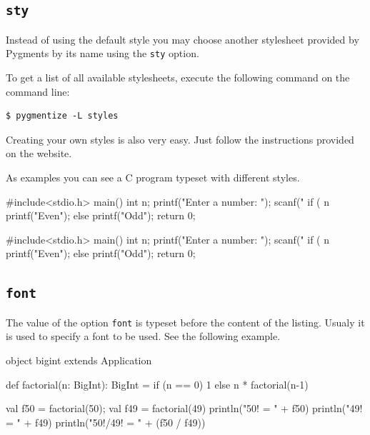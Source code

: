 \documentclass[10pt,a4paper]{article}
\begin{document}
\subsection{\texttt{sty}}

Instead of using the default style you may choose another stylesheet
provided by Pygments by its name using the \verb|sty| option.

To get a list of all available stylesheets, execute the following
command on the command line:
\begin{verbatim}
$ pygmentize -L styles
\end{verbatim}

Creating your own styles is also very easy. Just follow the instructions
provided on the website.

As examples you can see a C program typeset with different styles.

\begin{Example}
\noindent
\begin{minipage}[t]{0.49\linewidth}
  \begin{pygmented}[lang=c,gobble=4,sty=murphy]
    #include<stdio.h>
    main()
    { int n;
      printf("Enter a number: ");
      scanf("%
      if ( n%
         printf("Even\n");
      else
         printf("Odd\n");
      return 0;
    }
  \end{pygmented}
\end{minipage}
\hfil
\begin{minipage}[t]{0.49\linewidth}
  \begin{pygmented}[lang=c,gobble=4,sty=trac]
    #include<stdio.h>
    main()
    { int n;
      printf("Enter a number: ");
      scanf("%
      if ( n%
         printf("Even\n");
      else
         printf("Odd\n");
      return 0;
    }
  \end{pygmented}
\end{minipage}
\end{Example}

\subsection{\texttt{font}}

The value of the option \verb|font| is typeset before the content of the
listing. Usualy it is used to specify a font to be used. See the
following example.

\begin{Example}
\begin{pygmented}[lang=scala,font=\rmfamily\scshape\large]
object bigint extends Application {
  def factorial(n: BigInt): BigInt =
    if (n == 0) 1 else n * factorial(n-1)

  val f50 = factorial(50); val f49 = factorial(49)
  println("50! = " + f50)
  println("49! = " + f49)
  println("50!/49! = " + (f50 / f49))
}
\end{pygmented}
\end{Example}
\end{document}
